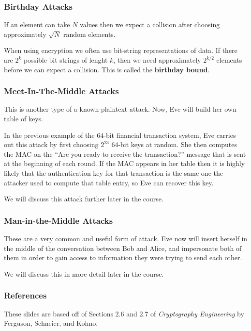 \documentclass{beamer}
\newcommand{\<}{\langle}
\renewcommand{\>}{\rangle}
\begin{document}
\begin{frame}
\frametitle{Birthday Attacks}

If an element can take $N$ values then we expect a collision after choosing approximately $\sqrt{N}$ random elements. \newline

When using encryption we often use bit-string representations of data. If there are $2^k$ possible bit strings of lenght $k$, then we need approximately $2^{k/2}$ elements before we can expect a collision. This is called the \textbf{birthday bound}.
\end{frame}



\begin{frame}
\frametitle{Meet-In-The-Middle Attacks}

This is another type of a known-plaintext attack. Now, Eve will build her own table of keys. \newline

In the previous example of the $64$-bit financial transaction system, Eve carries out this attack by first choosing $2^{23}$ $64$-bit keys at random. She then computes the MAC on the ``Are you ready to receive the transaction?'' message that is sent at the beginning of each round. If the MAC appears in her table then it is highly likely that the authentication key for that transaction is the same one the attacker used to compute that table entry, so Eve can recover this key. \newline

We will discuss this attack further later in the course. 
\end{frame}


\begin{frame}
\frametitle{Man-in-the-Middle Attacks}

These are a very common and useful form of attack. Eve now will insert herself in the middle of the conversation between Bob and Alice, and impersonate both of them in order to gain access to information they were trying to send each other.  \newline

We will discuss this in more detail later in the course.
\end{frame}

\begin{frame}
\frametitle{References}

These slides are based off of Sections 2.6 and 2.7 of \emph{Cryptography Engineering} by Ferguson, Schneier, and Kohno.
\end{frame}
\end{document}
